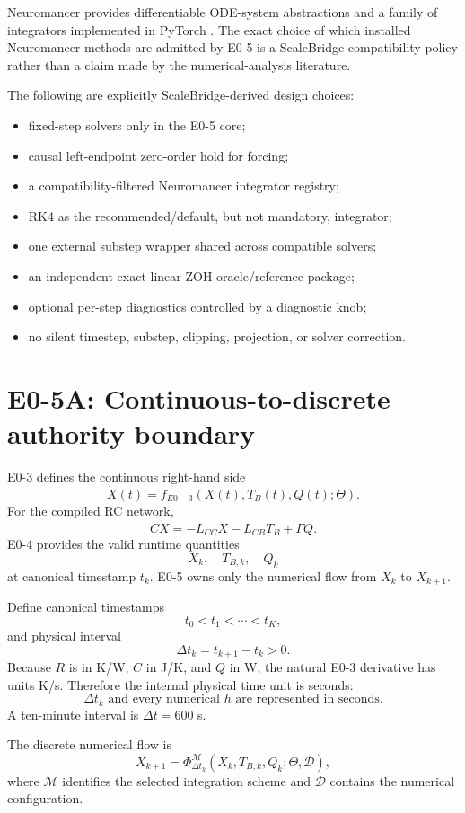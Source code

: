 \documentclass[11pt]{article}
\begin{document}
Neuromancer provides differentiable ODE-system abstractions and a family of
integrators implemented in PyTorch \cite{Neuromancer2023}. The exact choice of
which installed Neuromancer methods are admitted by E0-5 is a ScaleBridge
compatibility policy rather than a claim made by the numerical-analysis
literature.

The following are explicitly ScaleBridge-derived design choices:
\begin{itemize}[leftmargin=*]
\item fixed-step solvers only in the E0-5 core;
\item causal left-endpoint zero-order hold for forcing;
\item a compatibility-filtered Neuromancer integrator registry;
\item RK4 as the recommended/default, but not mandatory, integrator;
\item one external substep wrapper shared across compatible solvers;
\item an independent exact-linear-ZOH oracle/reference package;
\item optional per-step diagnostics controlled by a diagnostic knob;
\item no silent timestep, substep, clipping, projection, or solver correction.
\end{itemize}

\section{E0-5A: Continuous-to-discrete authority boundary}

E0-3 defines the continuous right-hand side
\[
\boxed{
\dot X(t)=f_{E0-3}(X(t),T_B(t),Q(t);\Theta).
}
\]
For the compiled RC network,
\[
\boxed{
C\dot X=-L_{CC}X-L_{CB}T_B+\Gamma Q.
}
\]
E0-4 provides the valid runtime quantities
\[
X_k,\quad T_{B,k},\quad Q_k
\]
at canonical timestamp $t_k$. E0-5 owns only the numerical flow from $X_k$ to
$X_{k+1}$.

Define canonical timestamps
\[
t_0<t_1<\cdots<t_K,
\]
and physical interval
\[
\boxed{\Delta t_k=t_{k+1}-t_k>0.}
\]
Because $R$ is in K/W, $C$ in J/K, and $Q$ in W, the natural E0-3 derivative
has units K/s. Therefore the internal physical time unit is seconds:
\[
\boxed{\Delta t_k\text{ and every numerical }h\text{ are represented in seconds}.}
\]
A ten-minute interval is $\Delta t=600$ s.

The discrete numerical flow is
\[
\boxed{
X_{k+1}=\Phi_{\Delta t_k}^{\mathcal M}
(X_k,T_{B,k},Q_k;\Theta,\mathcal D),
}
\]
where $\mathcal M$ identifies the selected integration scheme and $\mathcal D$
contains the numerical configuration.
\end{document}
